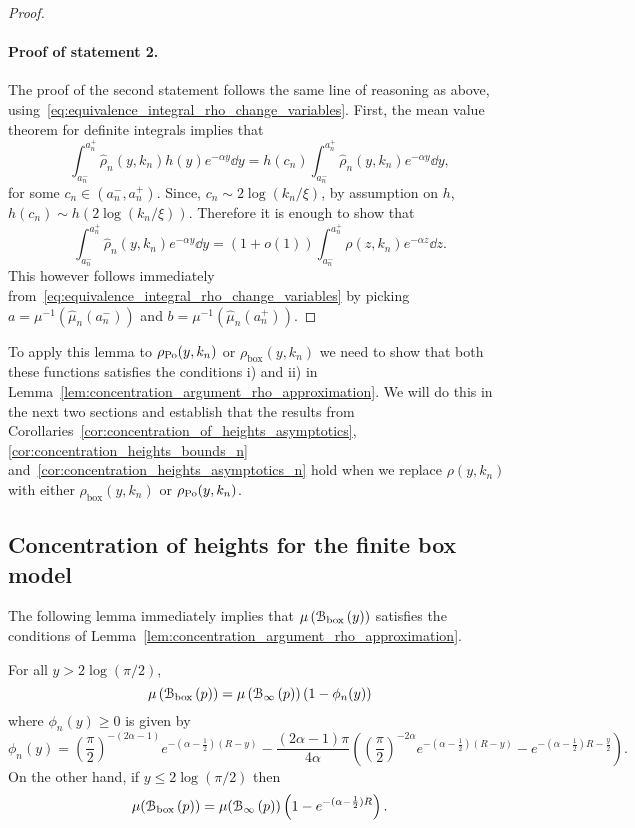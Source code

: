 \begin{proof}
\paragraph{Proof of statement 2.}

The proof of the second statement follows the same line of reasoning as above, using~\eqref{eq:equivalence_integral_rho_change_variables}. First, the mean value theorem for definite integrals implies that
\[
	\int_{a_n^-}^{a_n^+} \hat{\rho}_n(y,k_n) h(y) e^{-\alpha y} \dd y
	= h(c_n) \int_{a_n^-}^{a_n^+} \hat{\rho}_n(y,k_n) e^{-\alpha y} \dd y,
\]
for some $c_n \in (a_n^-, a_n^+)$. Since, $c_n \sim 2 \log(k_n/\xi)$, by assumption on $h$, $h(c_n)\sim h(2\log(k_n/\xi))$. 
Therefore it is enough to show that
\[
	\int_{a_n^-}^{a_n^+} \hat{\rho}_n(y,k_n) e^{-\alpha y} \dd y
	= \left(1 + o(1)\right) \int_{a_n^-}^{a_n^+} \rho(z,k_n) e^{-\alpha z} \dd z.
\] 
This however follows immediately from~\eqref{eq:equivalence_integral_rho_change_variables} by picking $a = \mu^{-1}(\hat{\mu}_n(a_n^-))$ and $b = \mu^{-1}(\hat{\mu}_n(a_n^+))$.
\end{proof}

To apply this lemma to $\rho_{{\mathrm{Po}}}(y,k_n)$ or $\rho_{\text{box}}(y,k_n)$ we need to show that both these functions satisfies the conditions i) and ii) in Lemma~\ref{lem:concentration_argument_rho_approximation}. We will do this in the next two sections and establish that the results from Corollaries~\ref{cor:concentration_of_heights_asymptotics}, \ref{cor:concentration_heights_bounds_n}
and~\ref{cor:concentration_heights_asymptotics_n} hold when we replace $\rho(y,k_n)$ with either $\rho_{\text{box}}(y,k_n)$
or $\rho_{{\mathrm{Po}}}(y,k_n)$. 



\subsection{Concentration of heights for the finite box model}\label{ssec:average_degree_P_n}

The following lemma immediately implies that $\mu\left({\mathcal B}_{\text{box}}\left(y\right)\right)$ satisfies the conditions of Lemma~\ref{lem:concentration_argument_rho_approximation}.

\begin{lemma}\label{lem:average_degree_P_n}
For all $y > 2\log(\pi/2)$,
\[
	\mu\left({\mathcal B}_{\text{box}}\left(p\right)\right) = \mu\left({\mathcal B}_{\infty}\left(p\right)\right)\left(1 - \phi_n(y)\right)
\]
where $\phi_n(y) \ge 0$ is given by
\[
	\phi_n(y) = \left(\frac{\pi}{2}\right)^{-(2\alpha - 1)}e^{-(\alpha-\frac{1}{2})(R - y)}
	- \frac{(2\alpha - 1)\pi}{4\alpha}\left(\left(\frac{\pi}{2}\right)^{-2\alpha} 
	e^{-(\alpha - \frac{1}{2})(R - y)} - e^{-(\alpha - \frac{1}{2})R - \frac{y}{2}}\right).
\]
On the other hand, if $y \le 2 \log(\pi/2)$ then
\[
	\mu({\mathcal B}_{\text{box}}\left(p\right)) = \mu({\mathcal B}_{\infty}\left(p\right))\left(1 - e^{-(\alpha - \frac{1}{2})R}\right).
\]
\end{lemma}

